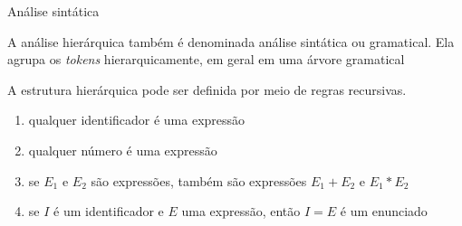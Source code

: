 \begin{frame}[fragile]{Análise sintática}

    A análise hierárquica também é denominada análise sintática ou gramatical. Ela agrupa os \textit{tokens} hierarquicamente, em geral em uma
    árvore gramatical%

    \vspace{0.1in}
    A estrutura hierárquica pode ser definida por meio de regras recursivas.%
    \vspace{0.1in}

    \begin{enumerate}
        \item qualquer identificador é uma expressão

        \item qualquer número é uma expressão

        \item se $E_1$ e $E_2$ são expressões, também são expressões $E_1 + E_2$ e $E_1 * E_2$
    
        \item se $I$ é um identificador e $E$ uma expressão, então $I = E$ é um enunciado
    \end{enumerate}

\end{frame}

